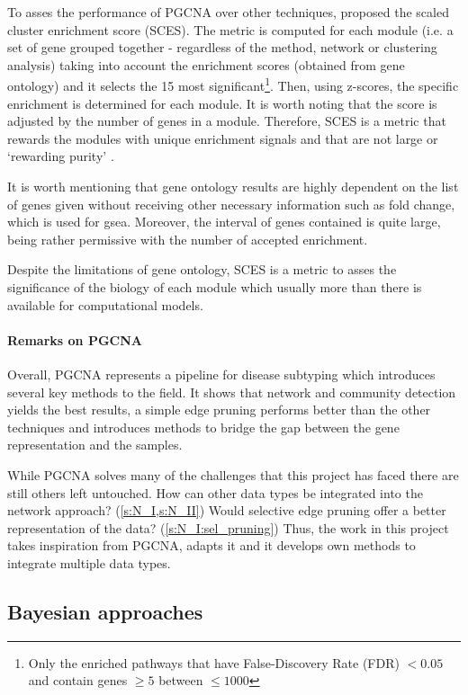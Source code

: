 To asses the performance of PGCNA over other techniques, \citet{Care2019-ij} proposed the scaled cluster enrichment score (SCES). The metric is computed for each module (i.e. a set of gene grouped together - regardless of the method, network or clustering analysis) taking into account the enrichment scores (obtained from gene ontology) and it selects the 15 most significant\footnote{Only the enriched pathways that have False-Discovery Rate (FDR) $<0.05$ and contain genes $\geq5$ between $\leq1000$}. Then, using z-scores, the specific enrichment is determined for each module. It is worth noting that the score is adjusted by the number of genes in a module. Therefore, SCES is a metric that rewards the modules with unique enrichment signals and that are not large or ‘rewarding purity' \citep{Care2019-ij}.

It is worth mentioning that gene ontology results are highly dependent on the list of genes given without receiving other necessary information such as fold change, which is used for \acrlong{gsea}. Moreover, the interval of genes contained is quite large, being rather permissive with the number of accepted enrichment.

Despite the limitations of gene ontology, SCES is a metric to asses the significance of the biology of each module which usually more than there is available for computational models.


\paragraph*{Remarks on PGCNA}

Overall, PGCNA represents a pipeline for disease subtyping which introduces several key methods to the field. It shows that network and community detection yields the best results, a simple edge pruning performs better than the other techniques and introduces methods to bridge the gap between the gene representation and the samples.

While PGCNA solves many of the challenges that this project has faced there are still others left untouched. How can other data types be integrated into the network approach? (\cref{s:N_I,s:N_II}) Would selective edge pruning offer a better representation of the data? (\cref{s:N_I:sel_pruning}) Thus, the work in this project takes inspiration from PGCNA, adapts it and it develops own methods to integrate multiple data types.

\subsection{Bayesian approaches} \label{s:lit:bayesian}

